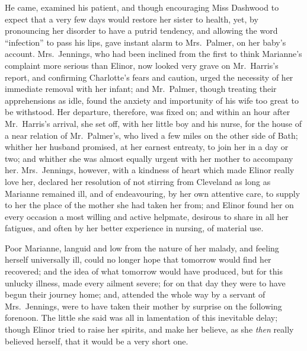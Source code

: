 He came, examined his patient, and though encouraging
Miss Dashwood to expect that a very few days would restore
her sister to health, yet, by pronouncing her disorder
to have a putrid tendency, and allowing the word ``infection''
to pass his lips, gave instant alarm to Mrs.\ Palmer,
on her baby's account.  Mrs.\ Jennings, who had been inclined
from the first to think Marianne's complaint more serious
than Elinor, now looked very grave on Mr.\ Harris's report,
and confirming Charlotte's fears and caution, urged the
necessity of her immediate removal with her infant;
and Mr.\ Palmer, though treating their apprehensions as idle,
found the anxiety and importunity of his wife too great
to be withstood.  Her departure, therefore, was fixed on;
and within an hour after Mr.\ Harris's arrival, she set off,
with her little boy and his nurse, for the house of a
near relation of Mr.\ Palmer's, who lived a few miles
on the other side of Bath; whither her husband promised,
at her earnest entreaty, to join her in a day or two;
and whither she was almost equally urgent with her
mother to accompany her.  Mrs.\ Jennings, however, with a
kindness of heart which made Elinor really love her,
declared her resolution of not stirring from Cleveland
as long as Marianne remained ill, and of endeavouring,
by her own attentive care, to supply to her the place
of the mother she had taken her from; and Elinor found her
on every occasion a most willing and active helpmate,
desirous to share in all her fatigues, and often by her
better experience in nursing, of material use.

Poor Marianne, languid and low from the nature
of her malady, and feeling herself universally ill,
could no longer hope that tomorrow would find her recovered;
and the idea of what tomorrow would have produced,
but for this unlucky illness, made every ailment severe;
for on that day they were to have begun their journey home;
and, attended the whole way by a servant of Mrs.\ Jennings,
were to have taken their mother by surprise on the
following forenoon.  The little she said was all in
lamentation of this inevitable delay; though Elinor tried
to raise her spirits, and make her believe, as she \emph{then}
really believed herself, that it would be a very short one.

